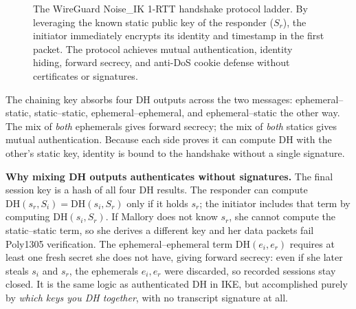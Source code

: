 \begin{figure}[H]
\caption{The WireGuard Noise\_IK 1-RTT handshake protocol ladder. By leveraging the known static public
key of the responder ($S_r$), the initiator immediately encrypts its identity and timestamp in the first packet.
The protocol achieves mutual authentication, identity hiding, forward secrecy, and anti-DoS cookie defense without certificates or signatures.}
\label{ch30:fig-wireguard-noise}
\end{figure}

The chaining key absorbs four DH outputs across the two messages: ephemeral--static, static--static, ephemeral--ephemeral, and ephemeral--static the other way. The mix of \emph{both} ephemerals gives forward secrecy; the mix of \emph{both} statics gives mutual authentication. Because each side proves it can compute DH with the other's static key, identity is bound to the handshake without a single signature.

\begin{whybox}
\textbf{Why mixing DH outputs authenticates without signatures.} The final session key is a hash of all four DH results. The responder can compute \(\mathrm{DH}(s_r, S_i) = \mathrm{DH}(s_i, S_r)\) only if it holds \(s_r\); the initiator includes that term by computing \(\mathrm{DH}(s_i, S_r)\). If Mallory does not know \(s_r\), she cannot compute the static--static term, so she derives a different key and her data packets fail Poly1305 verification. The ephemeral--ephemeral term \(\mathrm{DH}(e_i,e_r)\) requires at least one fresh secret she does not have, giving forward secrecy: even if she later steals \(s_i\) and \(s_r\), the ephemerals \(e_i,e_r\) were discarded, so recorded sessions stay closed. It is the same logic as authenticated DH in IKE, but accomplished purely by \emph{which keys you DH together}, with no transcript signature at all.
\end{whybox}

